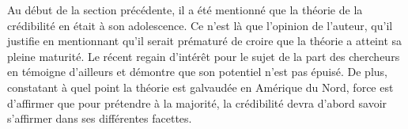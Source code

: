 Au début de la section précédente, il a été mentionné que la théorie
de la crédibilité en était à son adolescence. Ce n'est là que
l'opinion de l'auteur, qu'il justifie en mentionnant qu'il serait
prématuré de croire que la théorie a atteint sa pleine maturité. Le
récent regain d'intérêt pour le sujet de la part des chercheurs en
témoigne d'ailleurs et démontre que son potentiel n'est pas épuisé. De
plus, constatant à quel point la théorie est galvaudée en Amérique du
Nord, force est d'affirmer que pour prétendre à la majorité, la
crédibilité devra d'abord savoir s'affirmer dans ses différentes
facettes.

